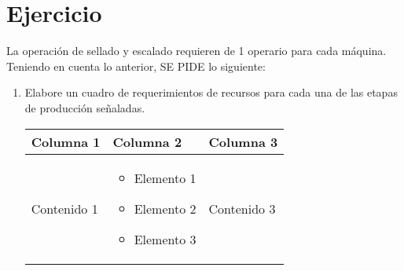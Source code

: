 \documentclass{templateNote}
\begin{document}
\section{Ejercicio}
\noindent
La operación de sellado y escalado requieren de 1 operario para cada máquina. Teniendo en cuenta lo anterior, SE PIDE lo siguiente:
\begin{enumerate}
  \item Elabore un cuadro de requerimientos de recursos para cada una de las etapas de producción señaladas.
\begin{center}
  \begin{tabularx}{\textwidth}{|X|X|X|}
    \hline
    Columna 1 & Columna 2 & Columna 3 \\
    \hline
    Contenido 1 & 
    \begin{itemize}
      \item Elemento 1
      \item Elemento 2
      \item Elemento 3
    \end{itemize} & 
    Contenido 3 \\
    \hline
  \end{tabularx}
\end{center}
\end{enumerate}
\end{document}
